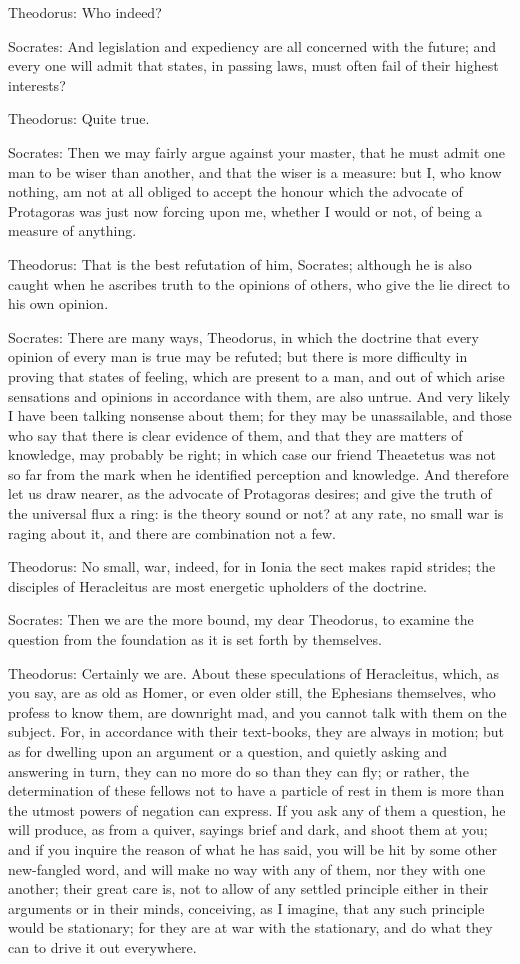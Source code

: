 Theodorus: Who indeed?

Socrates: And legislation and expediency are all concerned with the
future; and every one will admit that states, in passing laws, must
often fail of their highest interests?

Theodorus: Quite true.

Socrates: Then we may fairly argue against your master, that he must
admit one man to be wiser than another, and that the wiser is a measure:
but I, who know nothing, am not at all obliged to accept the honour
which the advocate of Protagoras was just now forcing upon me, whether I
would or not, of being a measure of anything.

Theodorus: That is the best refutation of him, Socrates; although he is
also caught when he ascribes truth to the opinions of others, who give
the lie direct to his own opinion.

Socrates: There are many ways, Theodorus, in which the doctrine that
every opinion of every man is true may be refuted; but there is more
difficulty in proving that states of feeling, which are present to a
man, and out of which arise sensations and opinions in accordance with
them, are also untrue. And very likely I have been talking nonsense
about them; for they may be unassailable, and those who say that there
is clear evidence of them, and that they are matters of knowledge, may
probably be right; in which case our friend Theaetetus was not so far
from the mark when he identified perception and knowledge. And therefore
let us draw nearer, as the advocate of Protagoras desires; and give the
truth of the universal flux a ring: is the theory sound or not? at any
rate, no small war is raging about it, and there are combination not a
few.

Theodorus: No small, war, indeed, for in Ionia the sect makes rapid
strides; the disciples of Heracleitus are most energetic upholders of
the doctrine.

Socrates: Then we are the more bound, my dear Theodorus, to examine the
question from the foundation as it is set forth by themselves.

Theodorus: Certainly we are. About these speculations of Heracleitus,
which, as you say, are as old as Homer, or even older still, the
Ephesians themselves, who profess to know them, are downright mad, and
you cannot talk with them on the subject. For, in accordance with their
text-books, they are always in motion; but as for dwelling upon an
argument or a question, and quietly asking and answering in turn, they
can no more do so than they can fly; or rather, the determination of
these fellows not to have a particle of rest in them is more than
the utmost powers of negation can express. If you ask any of them a
question, he will produce, as from a quiver, sayings brief and dark, and
shoot them at you; and if you inquire the reason of what he has said,
you will be hit by some other new-fangled word, and will make no way
with any of them, nor they with one another; their great care is, not
to allow of any settled principle either in their arguments or in
their minds, conceiving, as I imagine, that any such principle would be
stationary; for they are at war with the stationary, and do what they
can to drive it out everywhere.

